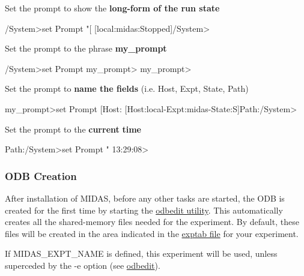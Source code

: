 \begin{DoxyEnumerate}
\item Set the prompt to show the {\bfseries  long-\/form of the run state } 
\begin{DoxyCode}
  /System>set Prompt "[%
  [local:midas:Stopped]/System>
\end{DoxyCode}
 
\item Set the prompt to the phrase {\bfseries my\_\-prompt} 
\begin{DoxyCode}
    /System>set Prompt my_prompt>
    my_prompt>
\end{DoxyCode}



\item Set the prompt to {\bfseries  name the fields } (i.e. Host, Expt, State, Path) 
\begin{DoxyCode}
    my_prompt>set Prompt [Host:%
    [Host:local-Expt:midas-State:S]Path:/System>
\end{DoxyCode}



\item Set the prompt to the {\bfseries current} {\bfseries time} 
\begin{DoxyCode}
    Path:/System>set Prompt "%
    13:29:08>
\end{DoxyCode}






\label{RC_odbedit_examples_idx_ODB_create}
\hypertarget{RC_odbedit_examples_idx_ODB_create}{}
 
\end{DoxyEnumerate}\hypertarget{RC_odbedit_examples_RC_odbedit_create_ODB}{}\subsubsection{ODB Creation}\label{RC_odbedit_examples_RC_odbedit_create_ODB}
After installation of MIDAS, before any other tasks are started, the ODB is created for the first time by starting the \hyperlink{RC_odbedit_utility}{odbedit utility}. This automatically creates all the shared-\/memory files needed for the experiment. By default, these files will be created in the area indicated in the \hyperlink{Q_Linux_Q_Linux_Exptab}{exptab file} for your experiment. \par
 If MIDAS\_\-EXPT\_\-NAME is defined, this experiment will be used, unless superceded by the -\/e option (see \hyperlink{RC_odbedit_utility}{odbedit}). \par
 

